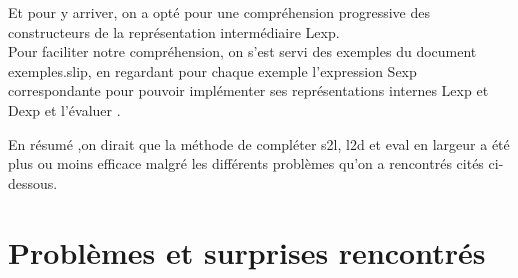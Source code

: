 \documentclass{article}
\begin{document}
Et pour y arriver, on a opté pour une compréhension progressive des constructeurs de la représentation intermédiaire Lexp.\\

Pour faciliter notre compréhension, on s’est servi des exemples du document exemples.slip, en regardant pour chaque exemple l'expression Sexp correspondante pour  pouvoir implémenter ses représentations internes Lexp et Dexp  et l’évaluer .

En résumé ,on dirait que la méthode de compléter s2l, l2d et eval en largeur a été plus ou moins efficace malgré les différents problèmes qu’on a rencontrés cités ci- dessous.


\newpage
\section{Problèmes et surprises rencontrés}
\end{document}
